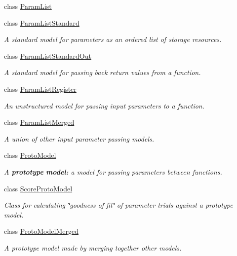 \begin{DoxyCompactItemize}
class \mbox{\hyperlink{class_param_list}{Param\+List}}
\item 
class \mbox{\hyperlink{class_param_list_standard}{Param\+List\+Standard}}
\begin{DoxyCompactList}\small\item\em A standard model for parameters as an ordered list of storage resources. \end{DoxyCompactList}\item 
class \mbox{\hyperlink{class_param_list_standard_out}{Param\+List\+Standard\+Out}}
\begin{DoxyCompactList}\small\item\em A standard model for passing back return values from a function. \end{DoxyCompactList}\item 
class \mbox{\hyperlink{class_param_list_register}{Param\+List\+Register}}
\begin{DoxyCompactList}\small\item\em An unstructured model for passing input parameters to a function. \end{DoxyCompactList}\item 
class \mbox{\hyperlink{class_param_list_merged}{Param\+List\+Merged}}
\begin{DoxyCompactList}\small\item\em A union of other input parameter passing models. \end{DoxyCompactList}\item 
class \mbox{\hyperlink{class_proto_model}{Proto\+Model}}
\begin{DoxyCompactList}\small\item\em A {\bfseries{prototype}} {\bfseries{model\+:}} a model for passing parameters between functions. \end{DoxyCompactList}\item 
class \mbox{\hyperlink{class_score_proto_model}{Score\+Proto\+Model}}
\begin{DoxyCompactList}\small\item\em Class for calculating \char`\"{}goodness of fit\char`\"{} of parameter trials against a prototype model. \end{DoxyCompactList}\item 
class \mbox{\hyperlink{class_proto_model_merged}{Proto\+Model\+Merged}}
\begin{DoxyCompactList}\small\item\em A prototype model made by merging together other models. \end{DoxyCompactList}\item 

\end{DoxyCompactItemize}
